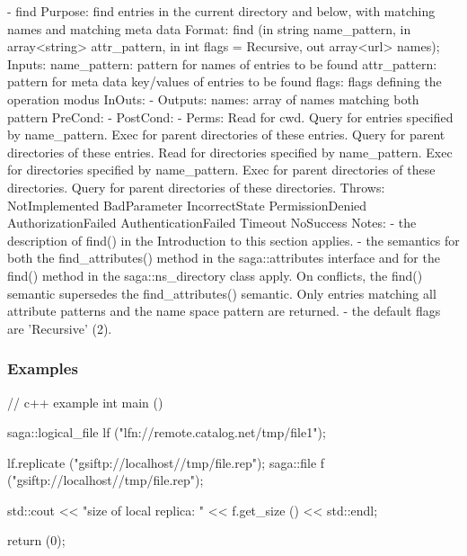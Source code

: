 \begin{myspec}
 
    - find
      Purpose:  find entries in the current directory and below, 
                with matching names and matching meta data
      Format:   find             (in  string           name_pattern,
                                  in  array<string>    attr_pattern,
                                  in  int              flags = Recursive,
                                  out array<url>       names);
      Inputs:   name_pattern:     pattern for names of
                                  entries to be found
                attr_pattern:     pattern for meta data
                                  key/values of entries to be 
                                  found
                flags:            flags defining the operation
                                  modus
      InOuts:   -
      Outputs:  names:            array of names matching both
                                  pattern
      PreCond:  -
      PostCond: -
      Perms:    Read  for cwd.
                Query for entries specified by name_pattern.
                Exec  for parent directories of these entries.
                Query for parent directories of these entries.
                Read  for directories specified by name_pattern.
                Exec  for directories specified by name_pattern.
                Exec  for parent directories of these directories.
                Query for parent directories of these directories.
      Throws:   NotImplemented
                BadParameter
                IncorrectState
                PermissionDenied
                AuthorizationFailed
                AuthenticationFailed
                Timeout
                NoSuccess
      Notes:    - the description of find() in the Introduction
                  to this section applies.
                - the semantics for both the find_attributes()
                  method in the saga::attributes interface and 
                  for the find() method in the 
                  saga::ns_directory class apply.  On 
                  conflicts, the find() semantic supersedes 
                  the find_attributes() semantic.  Only entries
                  matching all attribute patterns and the name 
                  space pattern are returned.
                - the default flags are 'Recursive' (2).
 \end{myspec}
 
 
 \subsubsection{Examples}
 
 \begin{mycode}
  // c++ example
  int main ()
  {
    saga::logical_file lf ("lfn://remote.catalog.net/tmp/file1");
 
    lf.replicate ("gsiftp://localhost//tmp/file.rep");
    saga::file f ("gsiftp://localhost//tmp/file.rep");
 
    std::cout << "size of local replica: "
              << f.get_size ()
              << std::endl;
 
    return (0);
  }
 \end{mycode}
 
 
